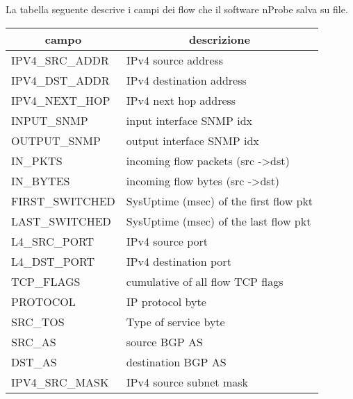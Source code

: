 \documentclass[../main.tex]{subfiles}
\begin{document}
La tabella seguente descrive i campi dei flow che il software nProbe salva su file.

\begin{table}[H]
\begin{tabular}{|l|l|}
\hline
\multicolumn{1}{|c|}{\textbf{campo}} & \multicolumn{1}{c|}{\textbf{descrizione}}     \\ \hline
IPV4\_SRC\_ADDR                      & IPv4 source address                           \\ \hline
IPV4\_DST\_ADDR                      & IPv4 destination address                      \\ \hline
IPV4\_NEXT\_HOP                      & IPv4 next hop address                         \\ \hline
INPUT\_SNMP                          & input interface SNMP idx                      \\ \hline
OUTPUT\_SNMP                         & output interface SNMP idx                     \\ \hline
IN\_PKTS                             & incoming flow packets (src -\textgreater dst) \\ \hline
IN\_BYTES                            & incoming flow bytes (src -\textgreater dst)   \\ \hline
FIRST\_SWITCHED                      & SysUptime (msec) of the first flow pkt        \\ \hline
LAST\_SWITCHED                       & SysUptime (msec) of the last flow pkt         \\ \hline
L4\_SRC\_PORT                        & IPv4 source port                              \\ \hline
L4\_DST\_PORT                        & IPv4 destination port                         \\ \hline
TCP\_FLAGS                           & cumulative of all flow TCP flags              \\ \hline
PROTOCOL                             & IP protocol byte                              \\ \hline
SRC\_TOS                             & Type of service byte                          \\ \hline
SRC\_AS                              & source BGP AS                                 \\ \hline
DST\_AS                              & destination BGP AS                            \\ \hline
IPV4\_SRC\_MASK                      & IPv4 source subnet mask                       \\ \hline

\end{tabular}
\end{table}
\end{document}
